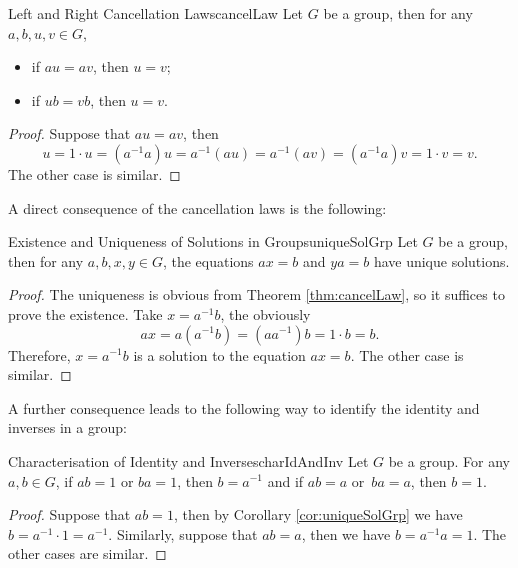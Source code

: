 \documentclass[math]{amznotes}
\theoremstyle{remark}
\newcommand{\0}{\mathbf{0}}
\newcommand{\1}{\mathbf{1}}
\begin{document}
\begin{thmbox}{Left and Right Cancellation Laws}{cancelLaw}
    Let $G$ be a group, then for any $a, b, u, v \in G$,
    \begin{itemize}
        \item if $au = av$, then $u = v$;
        \item if $ub = vb$, then $u = v$.
    \end{itemize}
    \tcblower
    \begin{proof}
        Suppose that $au = av$, then 
        \begin{equation*}
            u = 1 \cdot u = \left(a^{-1}a\right)u = a^{-1}\left(au\right) = a^{-1}\left(av\right) = \left(a^{-1}a\right)v = 1 \cdot v = v.
        \end{equation*}
        The other case is similar.
    \end{proof}
\end{thmbox}
A direct consequence of the cancellation laws is the following:
\begin{corbox}{Existence and Uniqueness of Solutions in Groups}{uniqueSolGrp}
    Let $G$ be a group, then for any $a, b, x, y \in G$, the equations $ax = b$ and $ya = b$ have unique solutions.
    \tcblower
    \begin{proof}
        The uniqueness is obvious from Theorem \ref{thm:cancelLaw}, so it suffices to prove the existence. Take $x = a^{-1}b$, the obviously
        \begin{equation*}
            ax = a\left(a^{-1}b\right) = \left(aa^{-1}\right)b = 1 \cdot b = b.
        \end{equation*}
        Therefore, $x = a^{-1}b$ is a solution to the equation $ax = b$. The other case is similar.
    \end{proof}
\end{corbox}
A further consequence leads to the following way to identify the identity and inverses in a group:
\begin{corbox}{Characterisation of Identity and Inverses}{charIdAndInv}
    Let $G$ be a group. For any $a, b \in G$, if $ab = 1$ or $ba = 1$, then $b = a^{-1}$ and if $ab = a$ or~$ba = a$, then $b = 1$.
    \tcblower
    \begin{proof}
        Suppose that $ab = 1$, then by Corollary \ref{cor:uniqueSolGrp} we have $b = a^{-1} \cdot 1 = a^{-1}$. Similarly, suppose that $ab = a$, then we have $b = a^{-1}a = 1$. The other cases are similar.
    \end{proof}
\end{corbox}
\end{document}
